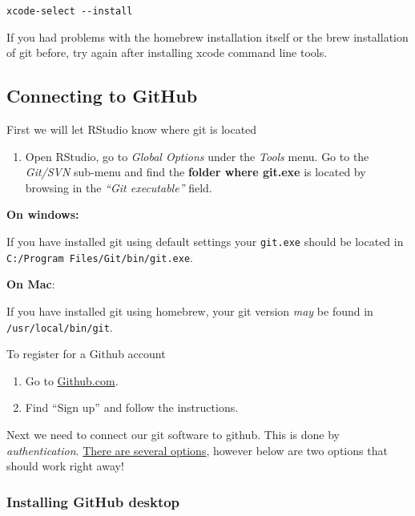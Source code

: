 \documentclass[
  11pt,
  letterpaper,
]{scrbook}
\providecommand{\tightlist}{%
  \setlength{\itemsep}{0pt}\setlength{\parskip}{0pt}}\usepackage{longtable,booktabs,array}
\begin{document}
\texttt{xcode-select\ -\/-install}

If you had problems with the homebrew installation itself or the brew
installation of git before, try again after installing xcode command
line tools.

\hypertarget{connecting-to-github}{%
\subsection{Connecting to GitHub}\label{connecting-to-github}}

First we will let RStudio know where git is located

\begin{enumerate}
\def\labelenumi{\arabic{enumi}.}
\tightlist
\item
  Open RStudio, go to \emph{Global Options} under the \emph{Tools} menu.
  Go to the \emph{Git/SVN} sub-menu and find the \textbf{folder where
  git.exe} is located by browsing in the \emph{``Git executable''}
  field.
\end{enumerate}

\textbf{On windows:}

If you have installed git using default settings your \texttt{git.exe}
should be located in \texttt{C:/Program\ Files/Git/bin/git.exe}.

\textbf{On Mac}:

If you have installed git using homebrew, your git version \emph{may} be
found in \texttt{/usr/local/bin/git}.

To register for a Github account

\begin{enumerate}
\def\labelenumi{\arabic{enumi}.}
\tightlist
\item
  Go to \href{www.github.com}{Github.com}.
\item
  Find ``Sign up'' and follow the instructions.
\end{enumerate}

Next we need to connect our git software to github. This is done by
\emph{authentication}.
\href{https://docs.github.com/en/authentication/keeping-your-account-and-data-secure/about-authentication-to-github}{There
are several options}, however below are two options that should work
right away!

\hypertarget{installing-github-desktop}{%
\subsubsection{Installing GitHub
desktop}\label{installing-github-desktop}}
\end{document}
